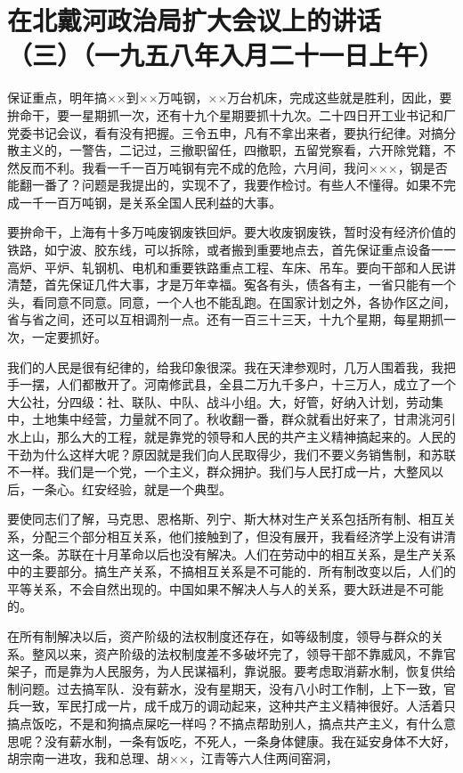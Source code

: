 \section[在北戴河政治局扩大会议上的讲话（三）（一九五八年入月二十一日上午）]{在北戴河政治局扩大会议上的讲话（三）（一九五八年入月二十一日上午）}


保证重点，明年搞××到××万吨钢，××万台机床，完成这些就是胜利，因此，要拚命干，要一星期抓一次，还有十九个星期要抓十九次。二十四日开工业书记和厂党委书记会议，看有没有把握。三令五申，凡有不拿出来者，要执行纪律。对搞分散主义的，一警告，二记过，三撤职留任，四撤职，五留党察看，六开除党籍，不然反而不利。我看一千一百万吨钢有完不成的危险，六月间，我问×××，钢是否能翻一番了？问题是我提出的，实现不了，我要作检讨。有些人不懂得。如果不完成一千一百万吨钢，是关系全国人民利益的大事。

要拚命干，上海有十多万吨废钢废铁回炉。要大收废钢废铁，暂时没有经济价值的铁路，如宁波、胶东线，可以拆除，或者搬到重要地点去，首先保证重点设备一一高炉、平炉、轧钢机、电机和重要铁路重点工程、车床、吊车。要向干部和人民讲清楚，首先保证几件大事，才是万年幸福。寃各有头，债各有主，一省只能有一个头，看同意不同意。同意，一个人也不能乱跑。在国家计划之外，各协作区之间，省与省之间，还可以互相调剂一点。还有一百三十三天，十九个星期，每星期抓一次，一定要抓好。

我们的人民是很有纪律的，给我印象很深。我在天津参观时，几万人围着我，我把手一摆，人们都散开了。河南修武县，全县二万九千多户，十三万人，成立了一个大公社，分四级：社、联队、中队、战斗小组。大，好管，好纳入计划，劳动集中，土地集中经营，力量就不同了。秋收翻一番，群众就看出好来了，甘肃洮河引水上山，那么大的工程，就是靠党的领导和人民的共产主义精神搞起来的。人民的干劲为什么这样大呢？原因就是我们向人民取得少，我们不要义务销售制，和苏联不一样。我们是一个党，一个主义，群众拥护。我们与人民打成一片，大整风以后，一条心。红安经验，就是一个典型。

要使同志们了解，马克思、恩格斯、列宁、斯大林对生产关系包括所有制、相互关系，分配三个部分相互关系，他们接触到了，但没有展开，我看经济学上没有讲清这一条。苏联在十月革命以后也没有解决。人们在劳动中的相互关系，是生产关系中的主要部分。搞生产关系，不搞相互关系是不可能的．所有制改变以后，人们的平等关系，不会自然出现的。中国如果不解决人与人的关系，要大跃进是不可能的。

在所有制解决以后，资产阶级的法权制度还存在，如等级制度，领导与群众的关系。整风以来，资产阶级的法权制度差不多破坏完了，领导干部不靠威风，不靠官架子，而是靠为人民服务，为人民谋福利，靠说服。要考虑取消薪水制，恢复供给制问题。过去搞军队．没有薪水，没有星期天，没有八小时工作制，上下一致，官兵一致，军民打成一片，成千成万的调动起来，这种共产主义精神很好。人活着只搞点饭吃，不是和狗搞点屎吃一样吗？不搞点帮助别人，搞点共产主义，有什么意思呢？没有薪水制，一条有饭吃，不死人，一条身体健康。我在延安身体不大好，胡宗南一进攻，我和总理、胡××，江青等六人住两间窑洞，

